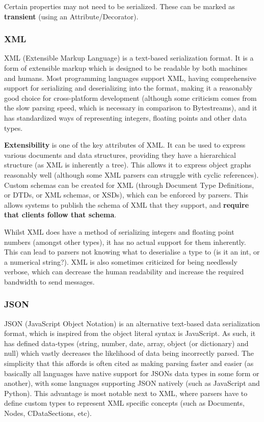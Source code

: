 \documentclass{article}
\begin{document}
Certain properties may not need to be serialized. These can be marked as \textbf{transient} (using an Attribute/Decorator). 

\subsubsection{XML}

XML (Extensible Markup Language) is a text-based serialization format. It is a form of extensible markup which is designed to be readable by both machines and humans. Most programming languages support XML, having comprehensive support for serializing and deserializing into the format, making it a reasonably good choice for cross-platform development (although some criticism comes from the slow parsing speed, which is necessary in comparison to Bytestreams), and it has standardized ways of representing integers, floating points and other data types.

\textbf{Extensibility} is one of the key attributes of XML. It can be used to express various documents and data structures, providing they have a hierarchical structure (as XML is inherently a tree). This allows it to express object graphs reasonably well (although some XML parsers can struggle with cyclic references). Custom schemas can be created for XML (through Document Type Definitions, or DTDs, or XML schemas, or XSDs), which can be enforced by parsers. This allows systems to publish the schema of XML that they support, and \textbf{require that clients follow that schema}.

Whilst XML does have a method of serializing integers and floating point numbers (amongst other types), it has no actual support for them inherently. This can lead to parsers not knowing what to deserialise a type to (is it an int, or a numerical string?). XML is also sometimes criticized for being needlessly verbose, which can decrease the human readability and increase the required bandwidth to send messages.

\subsubsection{JSON}

JSON (JavaScript Object Notation) is an alternative text-based data serialization format, which is inspired from the object literal syntax is JavaScript. As such, it has defined data-types (string, number, date, array, object (or dictionary) and null) which vastly decreases the likelihood of data being incorrectly parsed. The simplicity that this affords is often cited as making parsing faster and easier (as basically all languages have native support for JSONs data types in some form or another), with some languages supporting JSON natively (such as JavaScript and Python). This advantage is most notable next to XML, where parsers have to define custom types to represent XML specific concepts (such as Documents, Nodes, CDataSections, etc).
\end{document}
